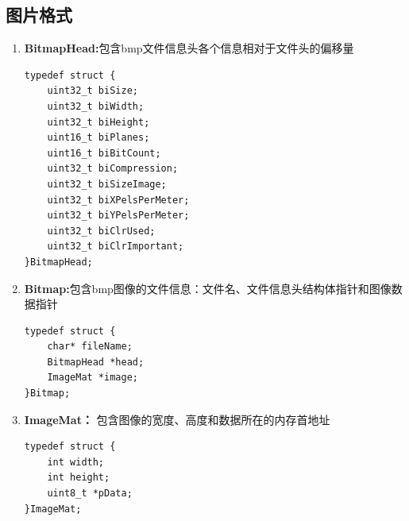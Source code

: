 \documentclass[12pt, a4paper, oneside]{ctexbook}
\begin{document}
		\subsection{图片格式}
		\begin{enumerate}
			\item \textbf{BitmapHead:}包含bmp文件信息头各个信息相对于文件头的偏移量
			\begin{lstlisting}
typedef struct {
	uint32_t biSize;
	uint32_t biWidth;
	uint32_t biHeight;
	uint16_t biPlanes;
	uint16_t biBitCount;
	uint32_t biCompression;
	uint32_t biSizeImage;
	uint32_t biXPelsPerMeter;
	uint32_t biYPelsPerMeter;
	uint32_t biClrUsed;
	uint32_t biClrImportant;
}BitmapHead;
			\end{lstlisting}
			
			
			\item \textbf{Bitmap:}包含bmp图像的文件信息：文件名、文件信息头结构体指针和图像数据指针
			\begin{lstlisting}
typedef struct {
	char* fileName;
	BitmapHead *head;
	ImageMat *image;
}Bitmap;
			\end{lstlisting}
			
			
			\item \textbf{ImageMat：} 包含图像的宽度、高度和数据所在的内存首地址
			\begin{lstlisting}[numbers=none]
typedef struct {
	int width;
	int height;
	uint8_t *pData;
}ImageMat;		
			\end{lstlisting}			
		\end{enumerate}
		
\end{document}
